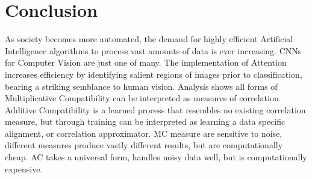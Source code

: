 \documentclass[11pt]{article}
\begin{document}
\section{Conclusion}
As society becomes more automated, the demand for highly efficient Artificial Intelligence algorithms to process vast amounts of data is ever increasing. CNNs for Computer Vision are just one of many. The implementation of Attention increases efficiency by identifying salient regions of images prior to classification, bearing a striking semblance to human vision. Analysis shows all forms of Multiplicative Compatibility can be interpreted as measures of correlation. Additive Compatibility is a learned process that resembles no existing correlation measure, but through training can be interpreted as learning a data specific alignment, or correlation approximator. MC measure are sensitive to noise, different measures produce vastly different results, but are computationally cheap. AC takes a universal form, handles noisy data well, but is computationally expensive.

\newpage
\printbibliography
\end{document}

